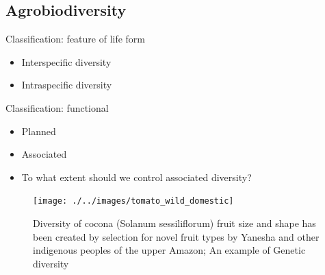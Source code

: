 \documentclass[ignorenonframetext,aspectratio=169]{beamer}
\providecommand{\tightlist}{%
  \setlength{\itemsep}{0pt}\setlength{\parskip}{0pt}}
\begin{document}
\hypertarget{agrobiodiversity}{%
\subsection{Agrobiodiversity}\label{agrobiodiversity}}

\begin{frame}{Classification: feature of life form}
\protect\hypertarget{classification-feature-of-life-form}{}

\begin{itemize}
\tightlist
\item
  Interspecific diversity
\item
  Intraspecific diversity
\end{itemize}

\end{frame}

\begin{frame}{Classification: functional}
\protect\hypertarget{classification-functional}{}

\begin{itemize}
\tightlist
\item
  Planned
\item
  Associated
\end{itemize}

\begin{itemize}[<+->]
\tightlist
\item
  \alert{To what extent should we control associated diversity?}
\end{itemize}

\begin{figure}
\texttt{[image: ./../images/tomato\_wild\_domestic]} \caption{Diversity of cocona (Solanum sessiliflorum) fruit size and shape has been created by selection for novel fruit types by Yanesha and other indigenous peoples of the upper Amazon; An example of Genetic diversity}\label{fig:tomato-diversity}
\end{figure}

\end{frame}
\end{document}
